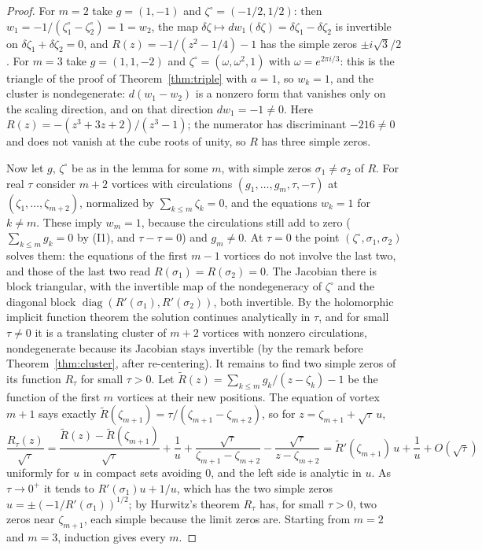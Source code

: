 \documentclass[11pt]{article}
\theoremstyle{definition}
\begin{document}
\begin{proof}
For $m = 2$ take $g = (1, -1)$ and $\zeta^\circ = (-1/2, 1/2)$: then $w_1 = -1/(\zeta^\circ_1 - \zeta^\circ_2) = 1 = w_2$, the map $\delta\zeta \mapsto dw_1(\delta\zeta) = \delta\zeta_1 - \delta\zeta_2$ is invertible on $\delta\zeta_1 + \delta\zeta_2 = 0$, and $R(z) = -1/(z^2 - 1/4) - 1$ has the simple zeros $\pm i\sqrt{3}/2$. For $m = 3$ take $g = (1, 1, -2)$ and $\zeta^\circ = (\omega, \omega^2, 1)$ with $\omega = e^{2\pi i/3}$: this is the triangle of the proof of Theorem~\ref{thm:triple} with $a = 1$, so $w_k = 1$, and the cluster is nondegenerate: $d(w_1 - w_2)$ is a nonzero form that vanishes only on the scaling direction, and on that direction $dw_1 = -1 \ne 0$. Here $R(z) = -(z^3 + 3z + 2)/(z^3 - 1)$; the numerator has discriminant $-216 \ne 0$ and does not vanish at the cube roots of unity, so $R$ has three simple zeros.

Now let $g$, $\zeta^\circ$ be as in the lemma for some $m$, with simple zeros $\sigma_1 \ne \sigma_2$ of $R$. For real $\tau$ consider $m + 2$ vortices with circulations $(g_1, \ldots, g_m, \tau, -\tau)$ at $(\zeta_1, \ldots, \zeta_{m+2})$, normalized by $\sum_{k\le m}\zeta_k = 0$, and the equations $w_k = 1$ for $k \ne m$. These imply $w_m = 1$, because the circulations still add to zero ($\sum_{k\le m}g_k = 0$ by (I1), and $\tau - \tau = 0$) and $g_m \ne 0$. At $\tau = 0$ the point $(\zeta^\circ, \sigma_1, \sigma_2)$ solves them: the equations of the first $m - 1$ vortices do not involve the last two, and those of the last two read $R(\sigma_1) = R(\sigma_2) = 0$. The Jacobian there is block triangular, with the invertible map of the nondegeneracy of $\zeta^\circ$ and the diagonal block $\operatorname{diag}(R'(\sigma_1), R'(\sigma_2))$, both invertible. By the holomorphic implicit function theorem the solution continues analytically in $\tau$, and for small $\tau \ne 0$ it is a translating cluster of $m + 2$ vortices with nonzero circulations, nondegenerate because its Jacobian stays invertible (by the remark before Theorem~\ref{thm:cluster}, after re-centering). It remains to find two simple zeros of its function $R_\tau$ for small $\tau > 0$. Let $\tilde R(z) = \sum_{k\le m}g_k/(z - \zeta_k) - 1$ be the function of the first $m$ vortices at their new positions. The equation of vortex $m + 1$ says exactly $\tilde R(\zeta_{m+1}) = \tau/(\zeta_{m+1} - \zeta_{m+2})$, so for $z = \zeta_{m+1} + \sqrt{\tau}\,u$,
\[
  \frac{R_\tau(z)}{\sqrt{\tau}} = \frac{\tilde R(z) - \tilde R(\zeta_{m+1})}{\sqrt\tau} + \frac{1}{u} + \frac{\sqrt{\tau}}{\zeta_{m+1} - \zeta_{m+2}} - \frac{\sqrt{\tau}}{z - \zeta_{m+2}} = \tilde R'(\zeta_{m+1})\,u + \frac{1}{u} + O(\sqrt{\tau})
\]
uniformly for $u$ in compact sets avoiding $0$, and the left side is analytic in $u$. As $\tau \to 0^+$ it tends to $R'(\sigma_1)u + 1/u$, which has the two simple zeros $u = \pm(-1/R'(\sigma_1))^{1/2}$; by Hurwitz's theorem $R_\tau$ has, for small $\tau > 0$, two zeros near $\zeta_{m+1}$, each simple because the limit zeros are. Starting from $m = 2$ and $m = 3$, induction gives every $m$.
\end{proof}
\end{document}
